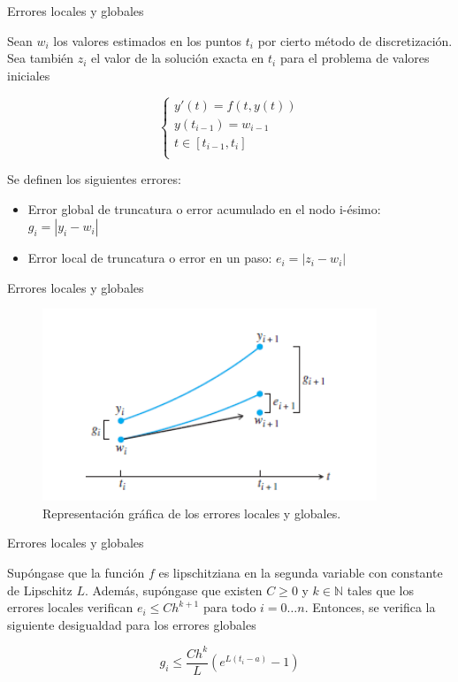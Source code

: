 		\begin{frame}{Errores locales y globales}		
			\begin{definition}
				Sean $w_i$ los valores estimados en los puntos $t_i$ por cierto método de discretización. Sea también $z_i$ el valor de la solución exacta en $t_i$ para el problema de valores iniciales
		
				\begin{equation}
					\begin{cases}
					y'(t) = f(t,y(t)) \\
					y(t_{i-1}) = w_{i-1} \\
					t \in [t_{i-1},t_{i}] \\
					\end{cases}
				\end{equation}
		
				Se definen los siguientes errores:
		
				\begin{itemize}
					\item Error global de truncatura o error acumulado en el nodo i-ésimo: $g_i=|y_i - w_i|$
					\item Error local de truncatura o error en un paso: $e_i = |z_i - w_i|$
				\end{itemize}
			\end{definition}				
		\end{frame}
		
		\begin{frame}{Errores locales y globales}		
			\begin{figure}[h]
				\centering
				\includegraphics[width=10cm]{./Images/error-euler.png}
				\caption{Representación gráfica de los errores locales y globales.}
				\label{fig:error}
			\end{figure}	
		\end{frame}
		
	
		\begin{frame}{Errores locales y globales}	
			\begin{theorem} \label{theorem:local-global-error}
				Supóngase que la función $f$ es lipschitziana en la segunda variable con constante de Lipschitz $L$. Además, supóngase que existen $C \ge 0$ y $k \in \mathbb{N}$ tales que los errores locales verifican $e_i \le C h^{k+1}$ para todo $i = 0 \ldots n$. Entonces, se verifica la siguiente desigualdad para los errores globales
						
				\begin{equation}
					g_i \le \frac{C h^k}{L} (e^{L(t_i-a)}-1)
				\end{equation}
			\end{theorem}
		\end{frame}	 
		
